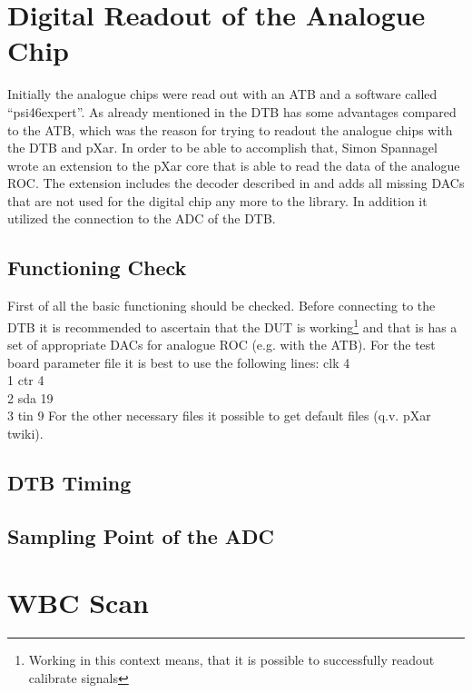 \section{Digital Readout of the Analogue Chip}
Initially the analogue chips were read out with an \ac{ATB} and a software called ``psi46expert''. As already mentioned in  the \ac{DTB} has some advantages compared to the \ac{ATB}, which was the reason for trying to readout the analogue chips with the \ac{DTB} and pXar. In order to be able to accomplish that, Simon Spannagel wrote an extension to the pXar core that is able to read the data of the analogue \ac{ROC}. The extension includes the decoder described in  and adds all missing \ac{DAC}s that are not used for the digital chip any more to the library. In addition it utilized the connection to the \ac{ADC} of the \ac{DTB}.
\subsection{Functioning Check}
First of all the basic functioning should be checked. Before connecting to the \ac{DTB} it is recommended to ascertain that the \ac{DUT} is working\footnote{Working in this context means, that it is possible to successfully readout calibrate signals} and that is has a set of appropriate \ac{DAC}s for analogue \ac{ROC} (e.g. with the \ac{ATB}). For the test board parameter file it is best to use the following lines:\s
{		clk   4\\
	1		ctr   4\\
	2		sda   19\\
	3		tin   9\s}
For the other necessary files it possible to get default files (q.v. pXar twiki).
\subsection{\ac{DTB} Timing}
\subsection{Sampling Point of the \ac{ADC}}
\section{WBC Scan}
